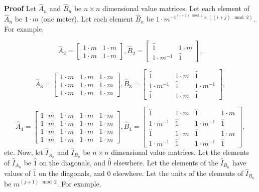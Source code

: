 \documentclass[10pt,letterpaper]{article}
\newenvironment{proof}{\noindent\textbf{Proof} }{\qed \newline}
\newcommand{\qed}{\nobreak \ifvmode \relax \else
      \ifdim\lastskip<1.5em \hskip-\lastskip
      \hskip1.5em plus0em minus0.5em \fi \nobreak
      \vrule height0.75em width0.5em depth0.25em\fi}
\numberwithin{equation}{section}
\begin{document}
\begin{proof}Let $\hat A_n$ and $\hat B_n$ be $n \times n$ dimensional
  value matrices.  Let each element of $\hat A_n$ be $1 \cdot m$ (one
  meter).  Let each element $\hat B_n$ be $1 \cdot m^{-1^{(i + 1) \mod
      2} \times ((i + j) \mod 2)}$.  For example,
 
\[ \hat A_2 = \left[ \begin{matrix} 
  1 \cdot m & 1 \cdot m \\
  1 \cdot m & 1 \cdot m
 \end{matrix} \right],
 \hat B_2 = \left[ \begin{matrix} 
  \hat 1 & 1 \cdot m \\
  1 \cdot m^{-1} & \hat 1
 \end{matrix} \right], \]

\[ \hat A_3 = \left[ \begin{matrix} 
  1 \cdot m & 1 \cdot m & 1 \cdot m \\
  1 \cdot m & 1 \cdot m & 1 \cdot m \\
  1 \cdot m & 1 \cdot m & 1 \cdot m
 \end{matrix} \right],
 \hat B_3 = \left[ \begin{matrix} 
  \hat 1 & 1 \cdot m & \hat 1 \\
  1 \cdot m^{-1} & \hat 1 & 1 \cdot m^{-1} \\
  \hat 1 & 1 \cdot m & \hat 1
 \end{matrix} \right], \]

\[ \hat A_4 = \left[ \begin{matrix} 
  1 \cdot m & 1 \cdot m & 1 \cdot m & 1 \cdot m \\
  1 \cdot m & 1 \cdot m & 1 \cdot m & 1 \cdot m \\
  1 \cdot m & 1 \cdot m & 1 \cdot m & 1 \cdot m \\
  1 \cdot m & 1 \cdot m & 1 \cdot m & 1 \cdot m
 \end{matrix} \right],
 \hat B_4 = \left[ \begin{matrix} 
  \hat 1 & 1 \cdot m & \hat 1 & 1 \cdot m \\
  1 \cdot m^{-1} & \hat 1 & 1 \cdot m^{-1} & \hat 1 \\
  \hat 1 & 1 \cdot m & \hat 1 & 1 \cdot m \\
  1 \cdot m^{-1} & \hat 1 & 1 \cdot m^{-1} & \hat 1
\end{matrix} \right], \] etc.  Now, let $\hat I_{A_n}$ and $\hat
I_{B_n}$ be $n \times n$ dimensional value matrices.  Let the elements
of $\hat I_{A_n}$ be $\hat 1$ on the diagonals, and $\hat 0$
elsewhere.  Let the elements of the $\hat I_{B_n}$ have values of $\hat 1$ on
the diagonals, and $\hat 0$ elsewhere.  Let the units of the elements of
$\hat I_{B_n}$ be $m^{(j + 1) \mod 2}$.  For example,


\end{proof}
\end{document}
